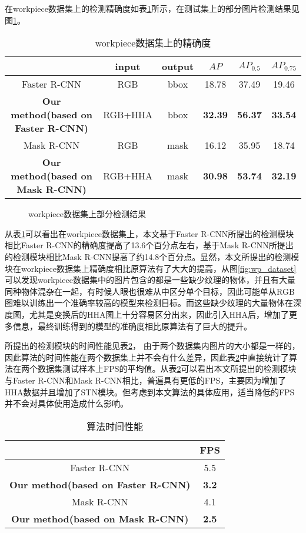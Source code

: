 在workpiece数据集上的检测精确度如表\ref{tab:ap2}所示，在测试集上的部分图片检测结果见图\ref{fig:wp_res}。
\begin{table}[ht]
  \centering
  \caption{workpiece数据集上的精确度}
    \begin{tabular}{cccccc}
      \toprule
      &input&output&$AP$&$AP_{0.5}$&$AP_{0.75}$ \\
      \midrule
      Faster R-CNN&RGB&bbox&18.78&37.49&19.46 \\
      \bf{Our method(based on Faster R-CNN)}&RGB+HHA&bbox&\bf{32.39}&\bf{56.37}&\bf{33.54} \\
      Mask R-CNN&RGB&mask&16.12&35.95&18.74 \\
      \bf{Our method(based on Mask R-CNN)}&RGB+HHA&mask&\bf{30.98}&\bf{53.74}&\bf{32.19} \\
      \bottomrule
    \end{tabular}
  \label{tab:ap2}
\end{table}
\begin{figure}[ht]
  \centering
  \hskip0.2cm
  \hskip0.2cm
  \caption{workpiece数据集上部分检测结果}
  \label{fig:wp_res}
\end{figure}
从表\ref{tab:ap2}可以看出在workpiece数据集上，本文基于Faster R-CNN所提出的检测模块相比Faster R-CNN的精确度提高了13.6个百分点左右，基于Mask R-CNN所提出的检测模块相比Mask R-CNN提高了约14.8个百分点。显然，本文所提出的检测模块在workpiece数据集上精确度相比原算法有了大大的提高，从图\ref{fig:wp_dataset}可以发现workpiece数据集中的图片包含的都是一些缺少纹理的物体，并且有大量同种物体混杂在一起，有时候人眼也很难从中区分单个目标，因此可能单从RGB图难以训练出一个准确率较高的模型来检测目标。而这些缺少纹理的大量物体在深度图，尤其是变换后的HHA图上十分容易区分出来，因此引入HHA后，增加了更多信息，最终训练得到的模型的准确度相比原算法有了巨大的提升。

所提出的检测模块的时间性能见表\ref{tab:fps}，
由于两个数据集内图片的大小都是一样的，因此算法的时间性能在两个数据集上并不会有什么差异，因此表\ref{tab:fps}中直接统计了算法在两个数据集测试样本上FPS的平均值。从表\ref{tab:fps}可以看出本文所提出的检测模块与Faster R-CNN和Mask R-CNN相比，普遍具有更低的FPS，主要因为增加了HHA数据并且增加了STN模块。但考虑到本文算法的具体应用，适当降低的FPS并不会对具体使用造成什么影响。
\begin{table}[ht]
  \centering
  \begin{tabular}{cc}
    \toprule
    &FPS \\
    \midrule
    Faster R-CNN&5.5 \\
    \bf{Our method(based on Faster R-CNN)}&\bf{3.2} \\
    Mask R-CNN&4.1 \\
    \bf{Our method(based on Mask R-CNN)}&\bf{2.5} \\
    \bottomrule
  \end{tabular}
  \caption{算法时间性能}
  \label{tab:fps}
\end{table}

